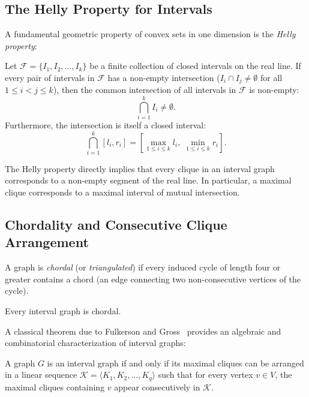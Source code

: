 \subsection{The Helly Property for Intervals}
A fundamental geometric property of convex sets in one dimension is the \emph{Helly property}:
\begin{proposition}
\label{prop:helly}
Let $\mathcal{F} = \{I_1, I_2, \dots, I_k\}$ be a finite collection of closed intervals on the real line. If every pair of intervals in $\mathcal{F}$ has a non-empty intersection ($I_i \cap I_j \ne \emptyset$ for all $1 \le i < j \le k$), then the common intersection of all intervals in $\mathcal{F}$ is non-empty:
\begin{equation}
    \bigcap_{i=1}^k I_i \ne \emptyset.
\end{equation}
Furthermore, the intersection is itself a closed interval:
\begin{equation}
    \bigcap_{i=1}^k [l_i, r_i] = \left[ \max_{1 \le i \le k} l_i, \; \min_{1 \le i \le k} r_i \right].
\end{equation}
\end{proposition}

The Helly property directly implies that every clique in an interval graph corresponds to a non-empty segment of the real line. In particular, a maximal clique corresponds to a maximal interval of mutual intersection.

\subsection{Chordality and Consecutive Clique Arrangement}
A graph is \emph{chordal} (or \emph{triangulated}) if every induced cycle of length four or greater contains a chord (an edge connecting two non-consecutive vertices of the cycle).
\begin{proposition}
Every interval graph is chordal.
\end{proposition}

A classical theorem due to Fulkerson and Gross~\cite{fulkerson1965incidence} provides an algebraic and combinatorial characterization of interval graphs:
\begin{theorem}
\label{thm:fulkerson_gross}
A graph $G$ is an interval graph if and only if its maximal cliques can be arranged in a linear sequence $\mathcal{K} = \langle K_1, K_2, \dots, K_q \rangle$ such that for every vertex $v \in V$, the maximal cliques containing $v$ appear consecutively in $\mathcal{K}$.
\end{theorem}

